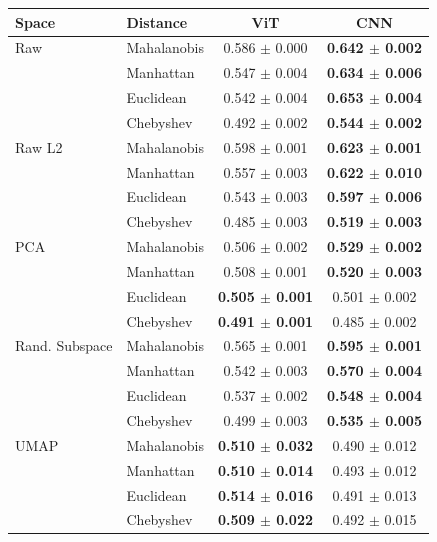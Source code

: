 \begin{tabular}{llcc}
\toprule
Space & Distance & ViT & CNN \\
\midrule
Raw & Mahalanobis & 0.586 $\pm$ 0.000 & \textbf{0.642 $\pm$ 0.002} \\
 & Manhattan & 0.547 $\pm$ 0.004 & \textbf{0.634 $\pm$ 0.006} \\
 & Euclidean & 0.542 $\pm$ 0.004 & \textbf{0.653 $\pm$ 0.004} \\
 & Chebyshev & 0.492 $\pm$ 0.002 & \textbf{0.544 $\pm$ 0.002} \\
\midrule
Raw L2 & Mahalanobis & 0.598 $\pm$ 0.001 & \textbf{0.623 $\pm$ 0.001} \\
 & Manhattan & 0.557 $\pm$ 0.003 & \textbf{0.622 $\pm$ 0.010} \\
 & Euclidean & 0.543 $\pm$ 0.003 & \textbf{0.597 $\pm$ 0.006} \\
 & Chebyshev & 0.485 $\pm$ 0.003 & \textbf{0.519 $\pm$ 0.003} \\
\midrule
PCA & Mahalanobis & 0.506 $\pm$ 0.002 & \textbf{0.529 $\pm$ 0.002} \\
 & Manhattan & 0.508 $\pm$ 0.001 & \textbf{0.520 $\pm$ 0.003} \\
 & Euclidean & \textbf{0.505 $\pm$ 0.001} & 0.501 $\pm$ 0.002 \\
 & Chebyshev & \textbf{0.491 $\pm$ 0.001} & 0.485 $\pm$ 0.002 \\
\midrule
Rand. Subspace & Mahalanobis & 0.565 $\pm$ 0.001 & \textbf{0.595 $\pm$ 0.001} \\
 & Manhattan & 0.542 $\pm$ 0.003 & \textbf{0.570 $\pm$ 0.004} \\
 & Euclidean & 0.537 $\pm$ 0.002 & \textbf{0.548 $\pm$ 0.004} \\
 & Chebyshev & 0.499 $\pm$ 0.003 & \textbf{0.535 $\pm$ 0.005} \\
\midrule
UMAP & Mahalanobis & \textbf{0.510 $\pm$ 0.032} & 0.490 $\pm$ 0.012 \\
 & Manhattan & \textbf{0.510 $\pm$ 0.014} & 0.493 $\pm$ 0.012 \\
 & Euclidean & \textbf{0.514 $\pm$ 0.016} & 0.491 $\pm$ 0.013 \\
 & Chebyshev & \textbf{0.509 $\pm$ 0.022} & 0.492 $\pm$ 0.015 \\

\bottomrule
\end{tabular}